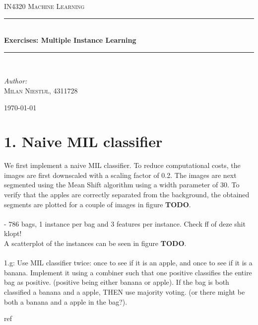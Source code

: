 \documentclass [a4paper] {report}
\begin{document}
	
	\begin{titlepage}
		\begin{center}
			
			\textsc{\LARGE IN4320 Machine Learning}\\[1.25cm]
			
			\rule{\linewidth}{0.5mm}\\[1.0cm]
			{\huge \bfseries Exercises: Multiple Instance Learning }\\[0.6cm]
			\rule{\linewidth}{0.5mm}\\[1.5cm]
			
			\begin{minipage}{0.4\textwidth}
				\begin{flushleft} \large	
					\emph{Author:}\\
					\textsc{Milan Niestijl, 4311728}
				\end{flushleft}
			\end{minipage}
			
			\vfill
			{\large \today}
		\end{center}
	\end{titlepage}
	
	\section*{1. Naive MIL classifier}
	We first implement a naive MIL classifier. To reduce computational costs, the images are first downscaled with a scaling factor of 0.2. The images are next segmented using the Mean Shift algorithm using a width parameter of 30. To verify that the apples are correctly separated from the background, the obtained segments are plotted for a couple of images in figure \textbf{TODO}.\\\\
	- 786 bags, 1 instance per bag and 3 features per instance. Check ff of deze shit klopt!\\
	A scatterplot of the instances can be seen in figure \textbf{TODO}.\\\\
	
	1.g: Use MIL classifier twice: once to see if it is an apple, and once to see if it is a banana. Implement it using a combiner such that one positive classifies the entire bag as positive. (positive being either banana or apple). If the bag is both classified a banana and a apple, THEN use majority voting. (or there might be both a banana and a apple in the bag?).
	
	
	
	\begin{bibliography}{ref}
		
	\end{bibliography}
\end{document}
